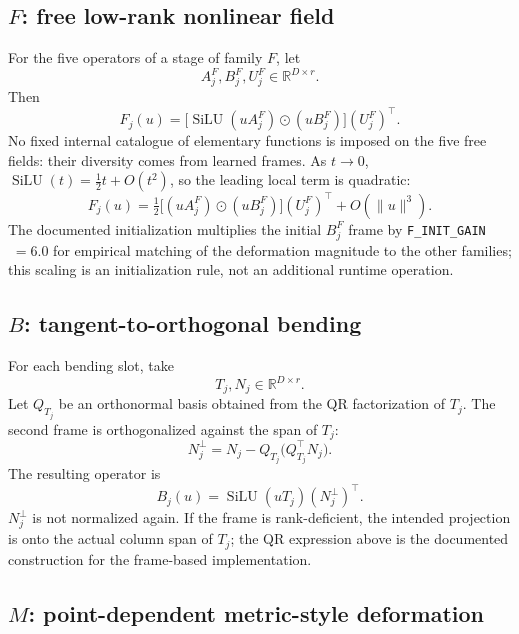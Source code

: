 \documentclass[11pt,a4paper]{article}
\newcommand{\R}{\mathbb{R}}
\newcommand{\SiLU}{\operatorname{SiLU}}
\newcommand{\T}{\top}
\begin{document}
\subsection{$F$: free low-rank nonlinear field}

For the five operators of a stage of family $F$, let
\begin{equation}
A_j^F,B_j^F,U_j^F\in\R^{D\times r}.
\end{equation}
Then
\begin{equation}
\boxed{F_j(u)=\bigl[\SiLU(uA_j^F)\odot(uB_j^F)\bigr](U_j^F)^{\T}.}
\end{equation}
No fixed internal catalogue of elementary functions is imposed on the five free fields: their diversity
comes from learned frames. As $t\to0$, $\SiLU(t)=\tfrac12t+O(t^2)$, so the leading local term is
quadratic:
\begin{equation}
F_j(u)=\tfrac12\bigl[(uA_j^F)\odot(uB_j^F)\bigr](U_j^F)^{\T}+O(\|u\|^3).
\end{equation}
The documented initialization multiplies the initial $B_j^F$ frame by \texttt{F\_INIT\_GAIN}$\;=6.0$ for
empirical matching of the deformation magnitude to the other families; this scaling is an initialization
rule, not an additional runtime operation.

\subsection{$B$: tangent-to-orthogonal bending}

For each bending slot, take
\begin{equation}
T_j,N_j\in\R^{D\times r}.
\end{equation}
Let $Q_{T_j}$ be an orthonormal basis obtained from the QR factorization of $T_j$. The second frame is
orthogonalized against the span of $T_j$:
\begin{equation}
N_j^{\perp}=N_j-Q_{T_j}\bigl(Q_{T_j}^{\T}N_j\bigr).
\end{equation}
The resulting operator is
\begin{equation}
\boxed{B_j(u)=\SiLU(uT_j)(N_j^{\perp})^{\T}.}
\end{equation}
$N_j^{\perp}$ is not normalized again. If the frame is rank-deficient, the intended projection is onto the
actual column span of $T_j$; the QR expression above is the documented construction for the frame-based
implementation.

\subsection{$M$: point-dependent metric-style deformation}
\end{document}
